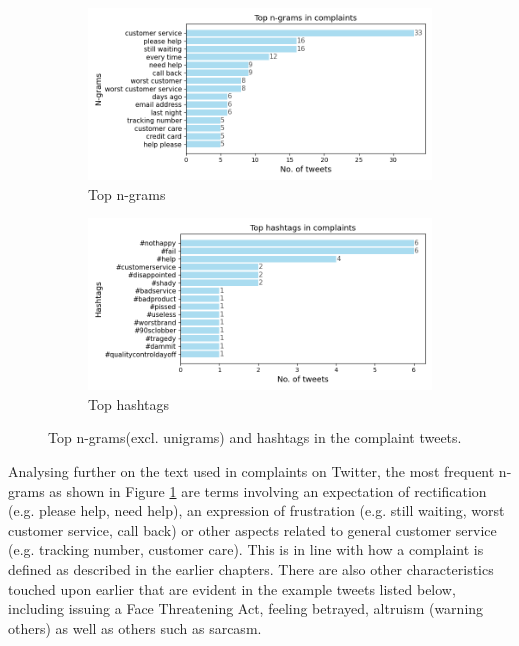 \begin{figure}[htbp]
    \centering
    \captionsetup{font=small}
    \begin{subfigure}{0.49\textwidth}
        \centering
        \includegraphics[width=\linewidth]{figures/top_ngram_horiz_bar.png}
        \caption{Top n-grams}
        \label{fig: top_ngrams}
    \end{subfigure}
    \hfill
    \begin{subfigure}{0.49\textwidth}
        \centering
        \includegraphics[width=\linewidth]{figures/top_hash_horiz_bar.png}
        \caption{Top hashtags}
        \label{fig: top_hashtags}
    \end{subfigure}
    \caption{Top n-grams(excl. unigrams) and hashtags in the complaint tweets.}
    \label{fig: top_ngrams_hashtags}
\end{figure}

Analysing further on the text used in complaints on Twitter, the most frequent n-grams as shown in Figure \ref{fig: top_ngrams} are terms involving an expectation of rectification (e.g. please help, need help), an expression of frustration (e.g. still waiting, worst customer service, call back) or other aspects related to general customer service (e.g. tracking number, customer care). This is in line with how a complaint is defined as described in the earlier chapters. There are also other characteristics touched upon earlier that are evident in the example tweets listed below, including issuing a Face Threatening Act, feeling betrayed, altruism (warning others) as well as others such as sarcasm.\\

